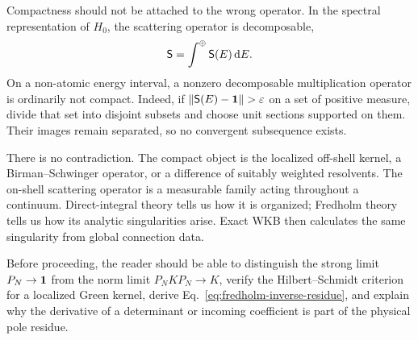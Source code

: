 Compactness should not be attached to the wrong operator.  In the spectral
representation of $H_0$, the scattering operator is decomposable,
\begin{equation}
  \mathsf{S}=\int^\oplus \mathsf{S}(E)\,\mathrm{d} E.
  \label{eq:S-decomposable-repeat}
\end{equation}
On a non-atomic energy interval, a nonzero decomposable multiplication
operator is ordinarily not compact.  Indeed, if
$\|\Scattering(E)-\identity\|>\varepsilon$ on a set of positive measure,
divide that set into disjoint subsets and choose unit sections supported on
them.  Their images remain separated, so no convergent subsequence exists.

There is no contradiction.  The compact object is the localized off-shell
kernel, a Birman--Schwinger operator, or a difference of suitably weighted
resolvents.  The on-shell scattering operator is a measurable family acting
throughout a continuum.  Direct-integral theory tells us how it is organized;
Fredholm theory tells us how its analytic singularities arise.  Exact WKB
then calculates the same singularity from global connection data.

\begin{checkpointbox}
Before proceeding, the reader should be able to distinguish the strong limit
$P_N\to\mathbf{1}$ from the norm limit $P_NKP_N\to K$, verify the
Hilbert--Schmidt criterion for a localized Green kernel, derive
Eq.~\eqref{eq:fredholm-inverse-residue}, and explain why the derivative of a
determinant or incoming coefficient is part of the physical pole residue.
\end{checkpointbox}
